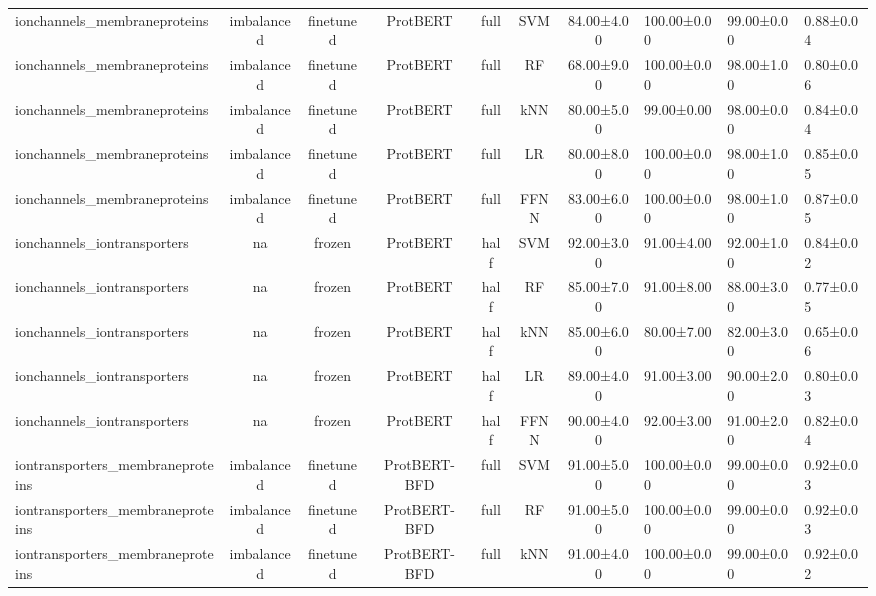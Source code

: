 \begin{tabular}{lcccccc}
    ionchannels\_membraneproteins & imbalanced &      finetuned &     ProtBERT &      full &        SVM &  84.00±4.00 & 100.00±0.00 &  99.00±0.00 & 0.88±0.04 \\
    ionchannels\_membraneproteins & imbalanced &      finetuned &     ProtBERT &      full &         RF &  68.00±9.00 & 100.00±0.00 &  98.00±1.00 & 0.80±0.06 \\
    ionchannels\_membraneproteins & imbalanced &      finetuned &     ProtBERT &      full &        kNN &  80.00±5.00 &  99.00±0.00 &  98.00±0.00 & 0.84±0.04 \\
    ionchannels\_membraneproteins & imbalanced &      finetuned &     ProtBERT &      full &         LR &  80.00±8.00 & 100.00±0.00 &  98.00±1.00 & 0.85±0.05 \\
    ionchannels\_membraneproteins & imbalanced &      finetuned &     ProtBERT &      full &       FFNN &  83.00±6.00 & 100.00±0.00 &  98.00±1.00 & 0.87±0.05 \\
     ionchannels\_iontransporters &         na &         frozen &     ProtBERT &      half &        SVM &  92.00±3.00 &  91.00±4.00 &  92.00±1.00 & 0.84±0.02 \\
     ionchannels\_iontransporters &         na &         frozen &     ProtBERT &      half &         RF &  85.00±7.00 &  91.00±8.00 &  88.00±3.00 & 0.77±0.05 \\
     ionchannels\_iontransporters &         na &         frozen &     ProtBERT &      half &        kNN &  85.00±6.00 &  80.00±7.00 &  82.00±3.00 & 0.65±0.06 \\
     ionchannels\_iontransporters &         na &         frozen &     ProtBERT &      half &         LR &  89.00±4.00 &  91.00±3.00 &  90.00±2.00 & 0.80±0.03 \\
     ionchannels\_iontransporters &         na &         frozen &     ProtBERT &      half &       FFNN &  90.00±4.00 &  92.00±3.00 &  91.00±2.00 & 0.82±0.04 \\
iontransporters\_membraneproteins & imbalanced &      finetuned & ProtBERT-BFD &      full &        SVM &  91.00±5.00 & 100.00±0.00 &  99.00±0.00 & 0.92±0.03 \\
iontransporters\_membraneproteins & imbalanced &      finetuned & ProtBERT-BFD &      full &         RF &  91.00±5.00 & 100.00±0.00 &  99.00±0.00 & 0.92±0.03 \\
iontransporters\_membraneproteins & imbalanced &      finetuned & ProtBERT-BFD &      full &        kNN &  91.00±4.00 & 100.00±0.00 &  99.00±0.00 & 0.92±0.02 \\

\end{tabular}
